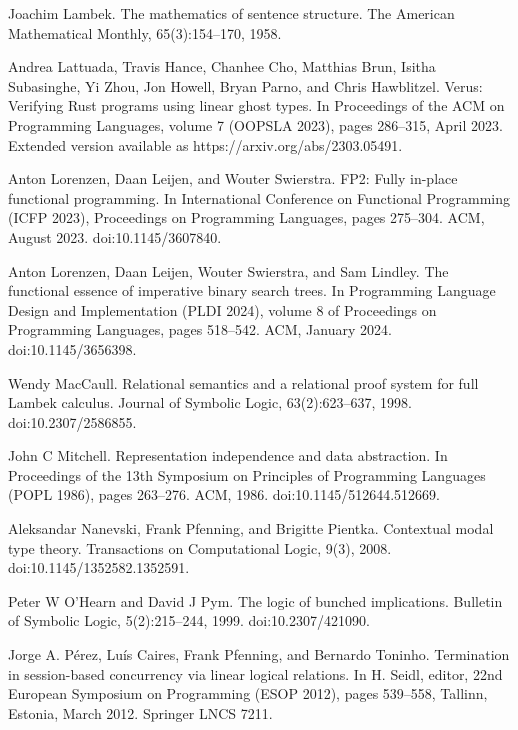 \par\noindent  [25]  Joachim Lambek.  The mathematics of sentence structure.  The American Mathematical Monthly, 65(3):154–170, 1958.  
 
\par\noindent  [26]  Andrea Lattuada, Travis Hance, Chanhee Cho, Matthias Brun, Isitha Subasinghe, Yi Zhou, Jon Howell, Bryan Parno, and Chris Hawblitzel.  Verus: Verifying Rust programs using linear ghost types.  In Proceedings of the ACM on Programming Languages, volume 7 (OOPSLA 2023), pages 286–315, April 2023.  Extended version available as https://arxiv.org/abs/2303.05491.  
 
\par\noindent  [27]  Anton Lorenzen, Daan Leijen, and Wouter Swierstra.  FP2: Fully in-place functional programming.  In International Conference on Functional Programming (ICFP 2023), Proceedings on Programming Languages, pages 275–304. ACM, August 2023.  doi:10.1145/3607840.  
 
\par\noindent  [28]  Anton Lorenzen, Daan Leijen, Wouter Swierstra, and Sam Lindley.  The functional essence of imperative binary search trees.  In Programming Language Design and Implementation (PLDI 2024), volume 8 of Proceedings on Programming Languages, pages 518–542. ACM, January 2024.  doi:10.1145/3656398.  
 
\par\noindent  [29]  Wendy MacCaull.  Relational semantics and a relational proof system for full Lambek calculus.  Journal of Symbolic Logic, 63(2):623–637, 1998.  doi:10.2307/2586855.  
 
\par\noindent  [30]  John C Mitchell.  Representation independence and data abstraction.  In Proceedings of the 13th Symposium on Principles of Programming Languages (POPL 1986), pages 263–276. ACM, 1986.  doi:10.1145/512644.512669.  
 
\par\noindent  [31]  Aleksandar Nanevski, Frank Pfenning, and Brigitte Pientka.  Contextual modal type theory.  Transactions on Computational Logic, 9(3), 2008.  doi:10.1145/1352582.1352591.  
 
\par\noindent  [32]  Peter W O’Hearn and David J Pym.  The logic of bunched implications.  Bulletin of Symbolic Logic, 5(2):215–244, 1999.  doi:10.2307/421090.  
 
\par\noindent  [33]  Jorge A. Pérez, Luís Caires, Frank Pfenning, and Bernardo Toninho.  Termination in session-based concurrency via linear logical relations.  In H. Seidl, editor, 22nd European Symposium on Programming (ESOP 2012), pages 539–558, Tallinn, Estonia, March 2012. Springer LNCS 7211.  
 
